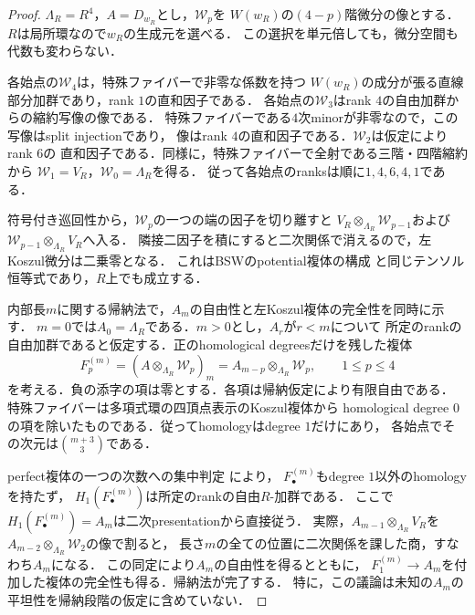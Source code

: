 \begin{proof}
$\Lambda_R=R^4$，$A=D_{w_R}$とし，$\mathcal W_p$を
$W(w_R)$の$(4-p)$階微分の像とする．$R$は局所環なので$w_R$の生成元を選べる．
この選択を単元倍しても，微分空間も代数も変わらない．

各始点の$\mathcal W_4$は，特殊ファイバーで非零な係数を持つ
$W(w_R)$の成分が張る直線部分加群であり，rank $1$の直和因子である．
各始点の$\mathcal W_3$はrank $4$の自由加群からの縮約写像の像である．
特殊ファイバーである$4$次minorが非零なので，この写像はsplit injectionであり，
像はrank $4$の直和因子である．$\mathcal W_2$は仮定によりrank $6$の
直和因子である．同様に，特殊ファイバーで全射である三階・四階縮約から
$\mathcal W_1=V_R$，$\mathcal W_0=\Lambda_R$を得る．
従って各始点のranksは順に$1,4,6,4,1$である．

符号付き巡回性から，$\mathcal W_p$の一つの端の因子を切り離すと
$V_R\otimes_{\Lambda_R}\mathcal W_{p-1}$および
$\mathcal W_{p-1}\otimes_{\Lambda_R}V_R$へ入る．
隣接二因子を積にすると二次関係で消えるので，左Koszul微分は二乗零となる．
これはBSWのpotential複体の構成
\cite[\S6, equation~(6.1) and Lemma~6.5]{BSWPotentials}
と同じテンソル恒等式であり，$R$上でも成立する．

内部長$m$に関する帰納法で，$A_m$の自由性と左Koszul複体の完全性を同時に示す．
$m=0$では$A_0=\Lambda_R$である．$m>0$とし，$A_r$が$r<m$について
所定のrankの自由加群であると仮定する．正のhomological degreesだけを残した複体
\begin{equation}\label{eq:p3-positive-koszul-induction}
 F^{(m)}_p=(A\otimes_{\Lambda_R}\mathcal W_p)_m
          =A_{m-p}\otimes_{\Lambda_R}\mathcal W_p,
 \qquad 1\le p\le4
\end{equation}
を考える．負の添字の項は零とする．各項は帰納仮定により有限自由である．
特殊ファイバーは多項式環の四頂点表示のKoszul複体から
homological degree $0$の項を除いたものである．従ってhomologyはdegree $1$だけにあり，
各始点でその次元は$\binom{m+3}{3}$である．

perfect複体の一つの次数への集中判定
\cite[Tags~0BDK, 0BCD]{StacksPerfect}により，
$F^{(m)}_\bullet$もdegree $1$以外のhomologyを持たず，
$H_1(F^{(m)}_\bullet)$は所定のrankの自由$R$-加群である．
ここで$H_1(F^{(m)}_\bullet)=A_m$は二次presentationから直接従う．
実際，$A_{m-1}\otimes_{\Lambda_R}V_R$を
$A_{m-2}\otimes_{\Lambda_R}\mathcal W_2$の像で割ると，
長さ$m$の全ての位置に二次関係を課した商，すなわち$A_m$になる．
この同定により$A_m$の自由性を得るとともに，
$F^{(m)}_1\to A_m$を付加した複体の完全性も得る．帰納法が完了する．
特に，この議論は未知の$A_m$の平坦性を帰納段階の仮定に含めていない．


\end{proof}

